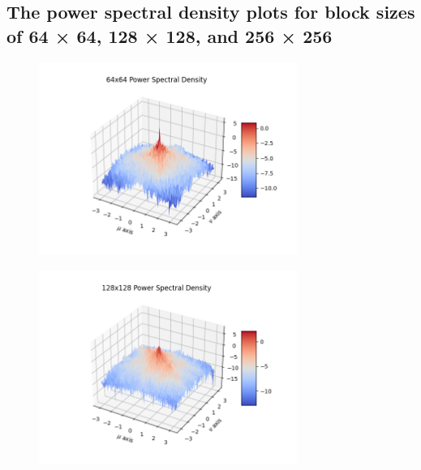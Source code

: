 \documentclass{article}
\begin{document}
\subsection{The power spectral density plots for block sizes of 64 × 64, 128 × 128, and 256 × 256}
\begin{figure}[H]
    \centering
    \includegraphics[width=0.75\textwidth]{../images/log-pwr-spec-density-64x64.png}
    \begin{center}
    \end{center}
\end{figure}
\begin{figure}[H]
    \centering
    \includegraphics[width=0.75\textwidth]{../images/log-pwr-spec-density-128x128.png}
    \begin{center}
    \end{center}
\end{figure}
\end{document}
